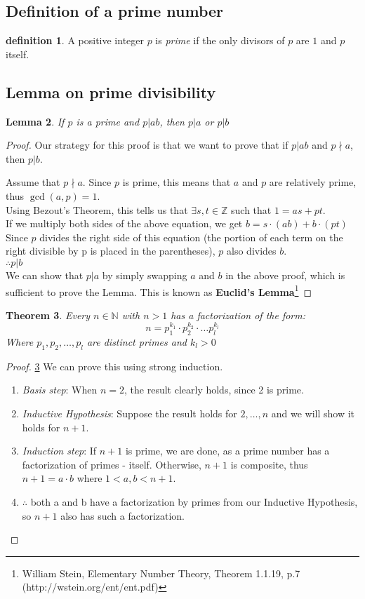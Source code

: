 \documentclass[10pt]{article}
\newcommand{\N}{\mathbb{N}}
\newcommand{\Z}{\mathbb{Z}}
\newtheorem{theorem}{Theorem}
\newtheorem{lemma}[theorem]{Lemma}
\theoremstyle{definition}
\newtheorem{definition}[theorem]{definition}
\theoremstyle{remark}
\def\Z{\mathbb{ Z}}
\def\N{\mathbb{N}}
\begin{document}
\subsection{Definition of a prime number}
\begin{definition}
A positive integer $p$ is \textit{prime} if the only divisors of $p$ are $1$ and $p$ itself.
\end{definition}
\subsection{Lemma on prime divisibility}
\begin{lemma}
If $p$ is a prime and $p|ab$, then $p|a$ or $p|b$
\end{lemma}
\begin{proof}
Our strategy for this proof is that we want to prove that if $p|ab$ and $p\nmid a$, then $p|b$.

Assume that $p\nmid a$.  Since $p$ is prime, this means that $a$ and $p$ are relatively prime, thus $\gcd(a,p) = 1$.\\
Using Bezout's Theorem, this tells us that $\exists s, t \in \Z$ such that $1 = as + pt$.\\
If we multiply both sides of the above equation, we get $b = s \cdot (ab) + b \cdot (pt)$\\
Since $p$ divides the right side of this equation (the portion of each term on the right divisible by p is placed in the parentheses), $p$ also divides $b$.\\
$\therefore p|b$\\
We can show that $p|a$ by simply swapping $a$ and $b$ in the above proof, which is sufficient to prove the Lemma.  This is known as \textbf{Euclid's Lemma}\footnote{William Stein, Elementary Number Theory, Theorem 1.1.19, p.7 (http://wstein.org/ent/ent.pdf)}
\end{proof}
\begin{theorem}\label{Prime Factorization of Integers}
Every $n \in \N$ with $n>1$ has a factorization of the form:
$$n = p^{k_1}_1 \cdot p^{k_2}_2 \cdot \ldots p^{k_l}_l$$
Where $p_1, p_2, \ldots, p_l$ are distinct primes and $k_l > 0$
\end{theorem}

\begin{proof}\ref{Prime Factorization of Integers}
We can prove this using strong induction.
\begin{enumerate}
\item \textit{Basis step}: When $n = 2$, the result clearly holds, since 2 is prime.
\item \textit{Inductive Hypothesis}: Suppose the result holds for $2,\ldots,n$ and we will show it holds for $n + 1$.
\item \textit{Induction step}: If $n+1$ is prime, we are done, as a prime number has a factorization of primes - itself.  Otherwise, $n+1$ is composite, thus $n+1 = a \cdot b$ where $1 < a,b < n + 1$.
\item $\therefore$ both a and b have a factorization by primes from our Inductive Hypothesis, so $n+1$ also has such a factorization.
\end{enumerate}
\end{proof}
\end{document}

